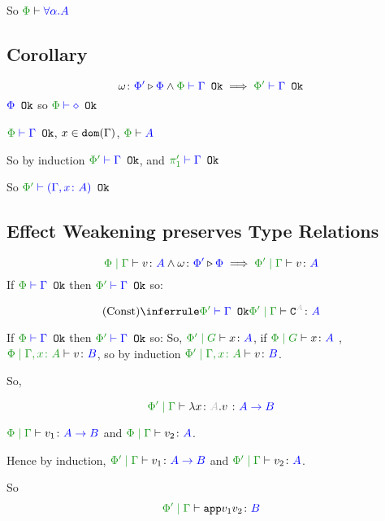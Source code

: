 {    So $\wellformed{\P}{\all{\a}{A}}$

    \subsection{Corollary}
    $$\wrel{\w}{\P'}{\P}\wedge \wellformedok{\P}{\G} \implies \wellformedok{\P'}{\G}$$
    \bi ${\color{blue} \Phi} \texttt{ Ok}$ so $\wellformedok{\P}{\nil}$

    \bi $\wellformedok{\P}{\G}$, $x\in\texttt{dom}(\Gamma)$, $\wellformed{\P}{A}$

    So by induction $\wellformedok{\P'}{\G}$, and $\wellformedok{\p'}{\G}$

    So $\wellformedok{\P'}{(\gax)}$
    
    \subsection{Effect Weakening preserves Type Relations}

    \begin{equation}
        \gpetyperelation{v}{A} \wedge \wrelw{\P'}{\P} \implies \etyperelation{\P'}{\G}{v}{A}
    \end{equation}
    \proof
    If $\wellformedok{\P}{\G}$ then $\wellformedok{\P'}{\G}$ so:

    \begin{equation}
        \ntreeruleI{Const}{\wellformedok{\P'}{\G}}{\etyperelation{\P'}{\G}{\const{A}}{A}}
    \end{equation}

    If $\wellformedok{\P}{\G}$ then $\wellformedok{\P'}{\G}$ so:
    So, $\etyperelation{\P'}{G}{x}{A}$, if $\etyperelation{\P}{G}{x}{A}$
    \bi, $\etyperelation{\P}{\gax}{v}{B}$, so by induction $\etyperelation{\P'}{\gax}{v}{B}$.

    So,

    \begin{equation}
        \etyperelation{\P'}{\G}{\lam{x}{A}{v}}{\ab}
    \end{equation}

    \bi $\gpetyperelation{v_1}{\ab}$ and $\gpetyperelation{v_2}{A}$.

    Hence by induction,
    $\gppetyperelation{v_1}{\ab}$ and $\gppetyperelation{v_2}{A}$.

    So $$\gppetyperelation{\app{v_1}{v_2}}{B}$$


}
